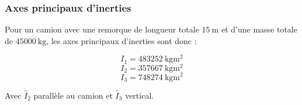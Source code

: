\documentclass[pdf]{beamer}
\begin{document}
\begin{frame}
	\frametitle{Axes principaux d'inerties}
	Pour un camion avec une remorque de longueur totale $\SI{15}{\meter}$
	et d'une masse totale de $\SI{45000}{\kilogram}$,
	les axes principaux d'inerties sont donc :
	
	$$I_1 = \SI{483252}{\kilogram\meter\squared}$$
	$$I_2 = \SI{357667}{\kilogram\meter\squared}$$
	$$I_3 = \SI{748274}{\kilogram\meter\squared}$$
	
	Avec $\hat{I}_2$ parallèle au camion et $\hat{I}_3$ vertical.
\end{frame}
\end{document}
